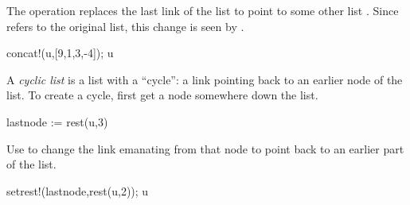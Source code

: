{{{{{{{{\begin{xtc}
\begin{xtccomment}
The operation 
replaces the last link of the list
 to point to some other list .
Since  refers to the original list,
this change is seen by .
\end{xtccomment}
\begin{spadsrc}
concat!(u,[9,1,3,-4]); u
\end{spadsrc}
\begin{TeXOutput}
\begin{fricasmath}{3}
%
\end{fricasmath}
\end{TeXOutput}
\end{xtc}
\begin{xtc}
\begin{xtccomment}
A {\it cyclic list} is a list with a ``cycle'':
a link pointing back to an earlier node of the list.
To create a cycle, first get a node somewhere down
the list.
\end{xtccomment}
\begin{spadsrc}
lastnode := rest(u,3)
\end{spadsrc}
\begin{TeXOutput}
\begin{fricasmath}{4}
%
\end{fricasmath}
\end{TeXOutput}
\end{xtc}
\begin{xtc}
\begin{xtccomment}
Use  to
change the link emanating from that node to point back to an
earlier part of the list.
\end{xtccomment}
\begin{spadsrc}
setrest!(lastnode,rest(u,2)); u
\end{spadsrc}
\begin{TeXOutput}
\begin{fricasmath}{5}
%
\end{fricasmath}
\end{TeXOutput}
\end{xtc}

}}}}}}}}
